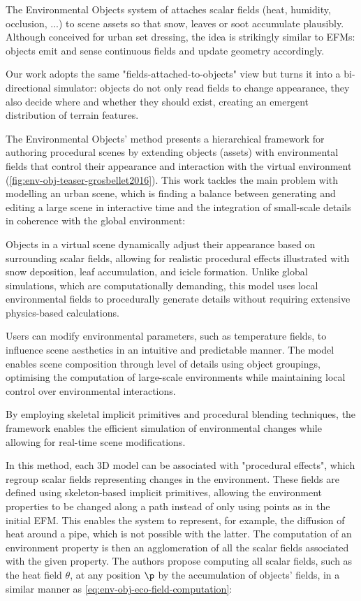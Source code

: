 The Environmental Objects system of \citep{Grosbellet2016} attaches scalar fields (heat, humidity, occlusion, ...) to scene assets so that snow, leaves or soot accumulate plausibly. Although conceived for urban set dressing, the idea is strikingly similar to EFMs: objects emit and sense continuous fields and update geometry accordingly.

Our work adopts the same "fields-attached-to-objects" view but turns it into a bi-directional simulator: objects do not only read fields to change appearance, they also decide where and whether they should exist, creating an emergent distribution of terrain features.

The Environmental Objects' method presents a hierarchical framework for authoring procedural scenes by extending objects (assets) with environmental fields that control their appearance and interaction with the virtual environment (\cref{fig:env-obj-teaser-grosbellet2016}). This work tackles the main problem with modelling an urban scene, which is finding a balance between generating and editing a large scene in interactive time and the integration of small-scale details in coherence with the global environment:
\begin{Itemize}
    \Item{} Objects in a virtual scene dynamically adjust their appearance based on surrounding scalar fields, allowing for realistic procedural effects illustrated with snow deposition, leaf accumulation, and icicle formation. Unlike global simulations, which are computationally demanding, this model uses local environmental fields to procedurally generate details without requiring extensive physics-based calculations.

    \Item{} Users can modify environmental parameters, such as temperature fields, to influence scene aesthetics in an intuitive and predictable manner. The model enables scene composition through level of details using object groupings, optimising the computation of large-scale environments while maintaining local control over environmental interactions.
\end{Itemize}
By employing skeletal implicit primitives and procedural blending techniques, the framework enables the efficient simulation of environmental changes while allowing for real-time scene modifications.

In this method, each 3D model can be associated with "procedural effects", which regroup scalar fields representing changes in the environment. These fields are defined using skeleton-based implicit primitives, allowing the environment properties to be changed along a path instead of only using points as in the initial EFM. This enables the system to represent, for example, the diffusion of heat around a pipe, which is not possible with the latter. The computation of an environment property is then an agglomeration of all the scalar fields associated with the given property. The authors propose computing all scalar fields, such as the heat field $\theta$, at any position $\p$ by the accumulation of objects' fields, in a similar manner as \cref{eq:env-obj-eco-field-computation}:

